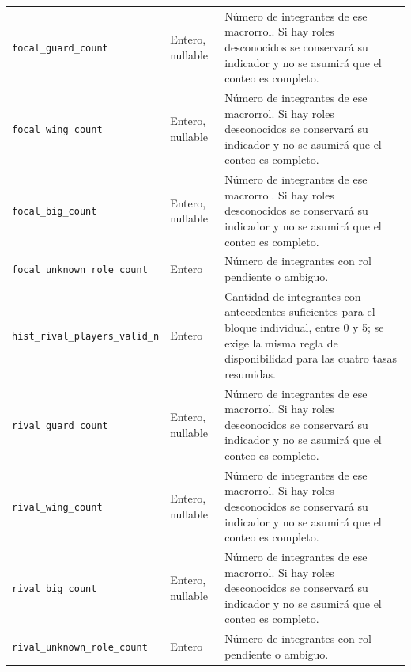 \begin{longtable}{@{}>{\raggedright\arraybackslash}p{5.0cm}>{\raggedright\arraybackslash}p{1.9cm}>{\raggedright\arraybackslash}p{7.7cm}@{}}
\texttt{focal\_\allowbreak guard\_\allowbreak count} & Entero, nullable & Número de integrantes de ese macrorrol. Si hay roles desconocidos se conservará su indicador y no se asumirá que el conteo es completo.\\
\texttt{focal\_\allowbreak wing\_\allowbreak count} & Entero, nullable & Número de integrantes de ese macrorrol. Si hay roles desconocidos se conservará su indicador y no se asumirá que el conteo es completo.\\
\texttt{focal\_\allowbreak big\_\allowbreak count} & Entero, nullable & Número de integrantes de ese macrorrol. Si hay roles desconocidos se conservará su indicador y no se asumirá que el conteo es completo.\\
\texttt{focal\_\allowbreak unknown\_\allowbreak role\_\allowbreak count} & Entero & Número de integrantes con rol pendiente o ambiguo.\\
\texttt{hist\_\allowbreak rival\_\allowbreak players\_\allowbreak valid\_\allowbreak n} & Entero & Cantidad de integrantes con antecedentes suficientes para el bloque individual, entre 0 y 5; se exige la misma regla de disponibilidad para las cuatro tasas resumidas.\\
\texttt{rival\_\allowbreak guard\_\allowbreak count} & Entero, nullable & Número de integrantes de ese macrorrol. Si hay roles desconocidos se conservará su indicador y no se asumirá que el conteo es completo.\\
\texttt{rival\_\allowbreak wing\_\allowbreak count} & Entero, nullable & Número de integrantes de ese macrorrol. Si hay roles desconocidos se conservará su indicador y no se asumirá que el conteo es completo.\\
\texttt{rival\_\allowbreak big\_\allowbreak count} & Entero, nullable & Número de integrantes de ese macrorrol. Si hay roles desconocidos se conservará su indicador y no se asumirá que el conteo es completo.\\
\texttt{rival\_\allowbreak unknown\_\allowbreak role\_\allowbreak count} & Entero & Número de integrantes con rol pendiente o ambiguo.\\
\end{longtable}
\endgroup
\begingroup
\small
{}
\setlength{\tabcolsep}{4pt}
\renewcommand{\arraystretch}{1.15}

